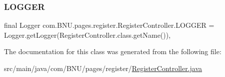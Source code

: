 \subsubsection{\texorpdfstring{L\+O\+G\+G\+ER}{LOGGER}}
{\footnotesize\ttfamily final Logger com.\+B\+N\+U.\+pages.\+register.\+Register\+Controller.\+L\+O\+G\+G\+ER = Logger.\+get\+Logger(Register\+Controller.\+class.\+get\+Name())\hspace{0.3cm}{\ttfamily [static]}, {\ttfamily [private]}}



The documentation for this class was generated from the following file\+:\begin{DoxyCompactItemize}
\item 
src/main/java/com/\+B\+N\+U/pages/register/\mbox{\hyperlink{_register_controller_8java}{Register\+Controller.\+java}}\end{DoxyCompactItemize}
